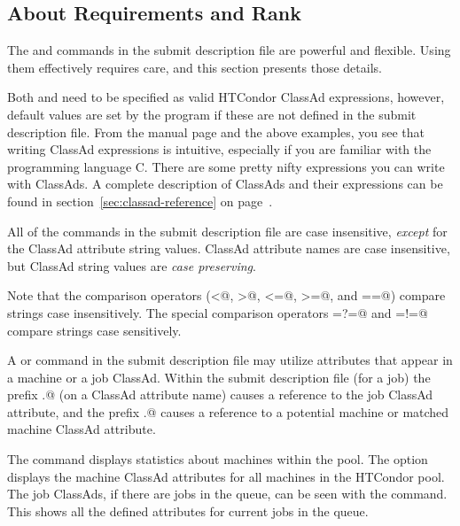 \subsection{\label{sec:user-man-req-and-rank}About Requirements and Rank}

The 
 and  commands in the submit description file
are powerful and flexible. 
Using them effectively requires care, and this section presents
those details.

Both  and  need to be specified 
as valid HTCondor ClassAd expressions, however, default values are set by the
 program if these are not defined in the submit description file.
From the  manual page and the above examples, you see
that writing ClassAd expressions is intuitive, especially if you
are familiar with the programming language C.  There are some
pretty nifty expressions you can write with ClassAds.
A complete description of ClassAds and their expressions
can be found in section~\ref{sec:classad-reference} on 
page~\pageref{sec:classad-reference}.

All of the commands in the submit description file are case insensitive, 
\emph{except} for the ClassAd attribute string values.
ClassAd attribute names are
case insensitive, but ClassAd string
values are \emph{case preserving}.

Note that the comparison operators
(\verb@<@, \verb@>@, \verb@<=@, \verb@>=@, and \verb@==@)
compare strings
case insensitively.  The special comparison operators 
\verb@=?=@ and \verb@=!=@
compare strings case sensitively.

A   or  command in
the submit description file may utilize attributes
that appear in a machine or a job ClassAd.
Within the submit description file (for a job) the
prefix \verb@MY.@ (on a ClassAd attribute name)
causes a reference to the job ClassAd attribute,
and the prefix \verb@TARGET.@ causes a reference to 
a potential machine or matched machine ClassAd attribute.

The  command displays
statistics about machines within the pool.
The  option displays the
machine ClassAd attributes for all machines in the HTCondor pool.
The job ClassAds, if there are jobs in the queue, can be seen
with the  command.
This shows all the defined attributes for current jobs in the queue.

